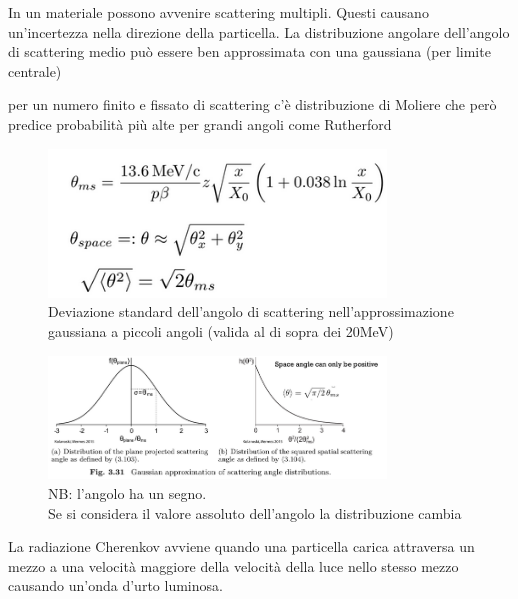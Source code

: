 In un materiale possono avvenire scattering multipli. Questi causano un'incertezza nella direzione della particella.
La distribuzione angolare dell'angolo di scattering medio può essere ben approssimata  con una gaussiana (per limite centrale)
\begin{remark}
    per un numero finito e fissato di scattering c'è distribuzione di Moliere che però predice probabilità più alte per grandi angoli come Rutherford
\end{remark}
\begin{figure}[H]
    \centering
    \includegraphics[width=0.8\textwidth,frame]{Chapters/images/Interazione_radiazione_materia/image-20220217025524958.png}
    \captionsetup{width=0.8\linewidth}
    \caption{Deviazione standard dell'angolo di scattering nell'approssimazione gaussiana a piccoli angoli (valida al di sopra dei 20MeV)}
    \label{multiplescattering}
\end{figure}
\begin{figure}[H]
    \centering
    \includegraphics[width=0.8\textwidth,frame]{Chapters/images/Interazione_radiazione_materia/image-20220217030024845.png}
    \captionsetup{width=0.8\linewidth}
    \caption{NB: l'angolo ha un segno.\\Se si considera il valore assoluto dell'angolo la distribuzione cambia}
    \label{fig:mmscatteringradius}
\end{figure}
La radiazione Cherenkov avviene quando una particella carica attraversa un mezzo a una velocità maggiore della velocità della luce nello stesso mezzo causando un'onda d'urto luminosa.
\\
